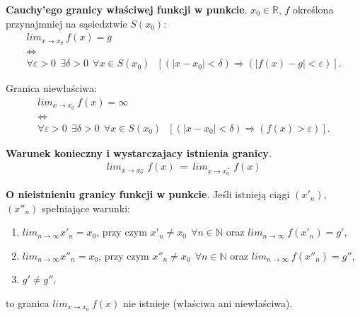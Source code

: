 \documentclass[main.tex]{subfiles}
\begin{document}
    \begin{definition}
        \textbf{Cauchy'ego granicy właściwej funkcji w punkcie}. $x_0 \in \mathbb{R}$, $f$
        określona przynajmniej na sąsiedztwie $S(x_0)$:
        \begin{gather*}
            lim_{x \rightarrow x_0} ~ f(x)  = g\\
            \Leftrightarrow\\
            \forall \varepsilon > 0 ~~ \exists \delta > 0 ~~ \forall  x \in S(x_0)  ~~~ [(|x - x_0| <  \delta) \Rightarrow (|f(x) - g| < \varepsilon)].
        \end{gather*}

        Granica niewłaściwa:
        \begin{gather*}
            lim_{x \rightarrow x_0} ~ f(x)  = \infty\\
            \Leftrightarrow\\
            \forall \varepsilon > 0 ~~ \exists \delta > 0 ~~ \forall  x \in S(x_0)  ~~~ [(|x - x_0| <  \delta) \Rightarrow (f(x) > \varepsilon)].
        \end{gather*}
    \end{definition}

    \begin{theorem}
        \textbf{Warunek konieczny i wystarczajacy istnienia granicy}.
        \begin{align*}
            lim_{x \rightarrow x^{-}_0}  ~ f(x) ~ = ~ lim_{x \rightarrow x^{+}_0}  ~ f(x)
        \end{align*}
    \end{theorem}


    \begin{theorem}
        \textbf{O nieistnieniu granicy funkcji w punkcie}. Jeśli istnieją ciągi $(x'_n)$, $(x''_n)$ spełniające warunki:
        \begin{enumerate}
            \item $lim_{n \rightarrow \infty} x'_n = x_0$, przy czym $x'_n \neq x_0 ~~ \forall n \in \mathbb{N}$
            oraz $lim_{n \rightarrow \infty}  ~ f(x'_n) = g'$,
            \item $lim_{n \rightarrow \infty} x''_n = x_0$, przy czym $x''_n \neq x_0 ~~ \forall n \in \mathbb{N}$
            oraz $lim_{n \rightarrow \infty}  ~ f(x''_n) = g''$,
            \item $g' \neq g''$,
        \end{enumerate}
        to granica $lim_{x \rightarrow x_0} ~ f(x)$ nie istnieje (właściwa ani niewłaściwa).
    \end{theorem}
\end{document}
